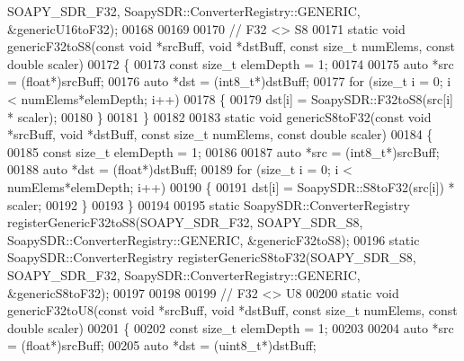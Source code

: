 \begin{DoxyCode}
      SOAPY_SDR_F32, SoapySDR::ConverterRegistry::GENERIC, &genericU16toF32);
00168 
00169 
00170 \textcolor{comment}{// F32 <> S8}
00171 \textcolor{keyword}{static} \textcolor{keywordtype}{void} genericF32toS8(\textcolor{keyword}{const} \textcolor{keywordtype}{void} *srcBuff, \textcolor{keywordtype}{void} *dstBuff, \textcolor{keyword}{const} \textcolor{keywordtype}{size\_t} numElems, \textcolor{keyword}{const} \textcolor{keywordtype}{double} scaler)
00172 \{
00173   \textcolor{keyword}{const} \textcolor{keywordtype}{size\_t} elemDepth = 1;
00174 
00175   \textcolor{keyword}{auto} *src = (\textcolor{keywordtype}{float}*)srcBuff;
00176   \textcolor{keyword}{auto} *dst = (int8\_t*)dstBuff;
00177   \textcolor{keywordflow}{for} (\textcolor{keywordtype}{size\_t} i = 0; i < numElems*elemDepth; i++)
00178     \{
00179       dst[i] = SoapySDR::F32toS8(src[i] * scaler);
00180     \}
00181 \}
00182 
00183 \textcolor{keyword}{static} \textcolor{keywordtype}{void} genericS8toF32(\textcolor{keyword}{const} \textcolor{keywordtype}{void} *srcBuff, \textcolor{keywordtype}{void} *dstBuff, \textcolor{keyword}{const} \textcolor{keywordtype}{size\_t} numElems, \textcolor{keyword}{const} \textcolor{keywordtype}{double} scaler)
00184 \{
00185   \textcolor{keyword}{const} \textcolor{keywordtype}{size\_t} elemDepth = 1;
00186 
00187   \textcolor{keyword}{auto} *src = (int8\_t*)srcBuff;
00188   \textcolor{keyword}{auto} *dst = (\textcolor{keywordtype}{float}*)dstBuff;
00189   \textcolor{keywordflow}{for} (\textcolor{keywordtype}{size\_t} i = 0; i < numElems*elemDepth; i++)
00190     \{
00191       dst[i] = SoapySDR::S8toF32(src[i]) * scaler;
00192     \}
00193 \}
00194 
00195 \textcolor{keyword}{static} SoapySDR::ConverterRegistry registerGenericF32toS8(SOAPY_SDR_F32, 
      SOAPY_SDR_S8, SoapySDR::ConverterRegistry::GENERIC, &genericF32toS8);
00196 \textcolor{keyword}{static} SoapySDR::ConverterRegistry registerGenericS8toF32(SOAPY_SDR_S8, 
      SOAPY_SDR_F32, SoapySDR::ConverterRegistry::GENERIC, &genericS8toF32);
00197 
00198 
00199 \textcolor{comment}{// F32 <> U8}
00200 \textcolor{keyword}{static} \textcolor{keywordtype}{void} genericF32toU8(\textcolor{keyword}{const} \textcolor{keywordtype}{void} *srcBuff, \textcolor{keywordtype}{void} *dstBuff, \textcolor{keyword}{const} \textcolor{keywordtype}{size\_t} numElems, \textcolor{keyword}{const} \textcolor{keywordtype}{double} scaler)
00201 \{
00202   \textcolor{keyword}{const} \textcolor{keywordtype}{size\_t} elemDepth = 1;
00203 
00204   \textcolor{keyword}{auto} *src = (\textcolor{keywordtype}{float}*)srcBuff;
00205   \textcolor{keyword}{auto} *dst = (uint8\_t*)dstBuff;

\end{DoxyCode}
